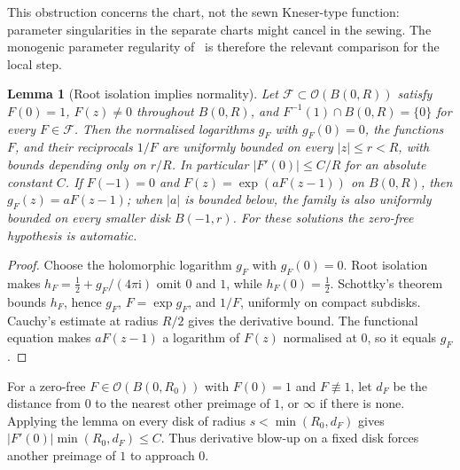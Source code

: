 \documentclass[11pt]{amsart}
\newtheorem{lemma}[theorem]{Lemma}
\theoremstyle{definition}
\newcommand{\ii}{\mathrm{i}}
\begin{document}
This obstruction concerns the chart, not the sewn Kneser-type function:
parameter singularities in the separate charts might cancel in the sewing.
The monogenic parameter regularity of~\cite{MarmiCarminati2008} is therefore
the relevant comparison for the local step.

\begin{lemma}[Root isolation implies normality]\label{lem:root-normal}
Let $\mathcal F\subset\mathcal O(B(0,R))$ satisfy $F(0)=1$, $F(z)\ne0$
throughout $B(0,R)$, and
$F^{-1}(1)\cap B(0,R)=\{0\}$ for every $F\in\mathcal F$.
Then the normalised logarithms $g_F$ with $g_F(0)=0$, the functions $F$,
and their reciprocals $1/F$ are uniformly
bounded on every $|z|\le r<R$, with bounds depending only on $r/R$.
In particular $|F'(0)|\le C/R$ for an absolute constant $C$.
If $F(-1)=0$ and $F(z)=\exp(aF(z-1))$ on $B(0,R)$, then
$g_F(z)=aF(z-1)$; when $|a|$ is bounded below, the family is also
uniformly bounded on every smaller disk $B(-1,r)$.  For these
solutions the zero-free hypothesis is automatic.
\end{lemma}

\begin{proof}
Choose the holomorphic logarithm $g_F$ with $g_F(0)=0$.  Root isolation
makes $h_F=\tfrac12+g_F/(4\pi\ii)$ omit $0$ and $1$, while
$h_F(0)=\tfrac12$.  Schottky's theorem bounds $h_F$, hence $g_F$,
$F=\exp g_F$, and $1/F$, uniformly on compact subdisks.  Cauchy's
estimate at radius $R/2$ gives the derivative bound.  The functional
equation makes $aF(z-1)$ a logarithm of $F(z)$ normalised at $0$,
so it equals $g_F$.
\end{proof}

For a zero-free $F\in\mathcal O(B(0,R_0))$ with $F(0)=1$ and
$F\not\equiv1$, let $d_F$ be the distance from $0$ to the nearest
other preimage of $1$, or $\infty$ if there is none.  Applying the lemma
on every disk of radius $s<\min(R_0,d_F)$ gives
$|F'(0)|\min(R_0,d_F)\le C$.  Thus derivative blow-up on a fixed disk
forces another preimage of $1$ to approach $0$.
\end{document}
